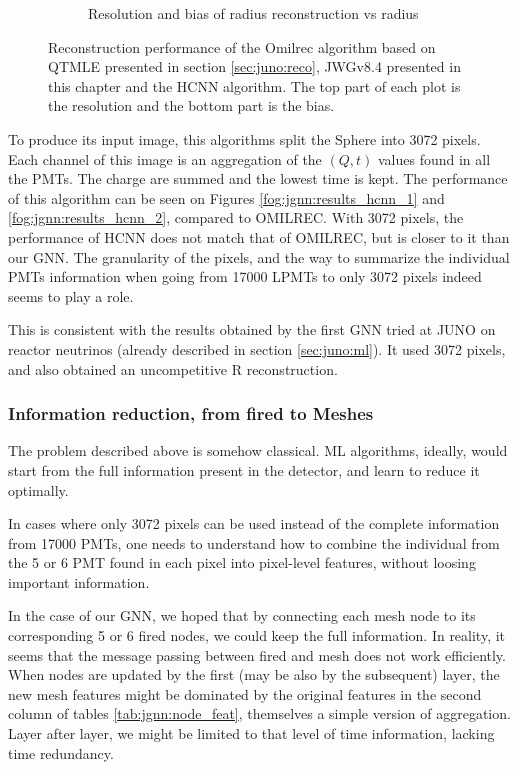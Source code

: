 \documentclass[../main.tex]{subfiles}
\begin{document}
\begin{figure}[ht]
\begin{subfigure}[t]{0.48\linewidth}
    \caption{Resolution and bias of radius reconstruction vs radius}
    \label{fig:jgnn:MSBvRTC_hcnn}
  \end{subfigure}
  \caption{Reconstruction performance of the Omilrec algorithm based on QTMLE presented in section \ref{sec:juno:reco}, JWGv8.4 presented in this chapter and the HCNN algorithm. The top part of each plot is the resolution and the bottom part is the bias.}
  \label{fig:jgnn:results_hcnn_2}
\end{figure}


To produce its input image, this algorithms split the Sphere into 3072 pixels. Each channel of this image is an aggregation of the $(Q, t)$ values found in all the PMTs. The charge are summed and the lowest time is kept. The performance of this algorithm can be seen on Figures \ref{fog:jgnn:results_hcnn_1} and \ref{fog:jgnn:results_hcnn_2}, compared to OMILREC. With 3072 pixels, the performance of HCNN does not match that of OMILREC, but is closer to it than our GNN. The granularity of the pixels, and the way to summarize the individual PMTs information when going from 17000 LPMTs to only 3072 pixels indeed seems to play a role.

This is consistent with the results obtained by the first GNN tried at JUNO on reactor neutrinos (already described in section \ref{sec:juno:ml}).
It used 3072 pixels, and also obtained an uncompetitive R reconstruction.

\subsubsection{Information reduction, from fired to Meshes}

The problem described above is somehow classical. ML algorithms, ideally, would start from the full information present in the detector, and learn to reduce it optimally.

In cases where only 3072 pixels can be used instead of the complete information from 17000 PMTs, one needs to understand how to combine the individual from the 5 or 6 PMT found in each pixel into pixel-level features, without loosing important information.

In the case of our GNN, we hoped that by connecting each mesh node to its corresponding 5 or 6 fired nodes, we could keep the full information. In reality, it seems that the message passing between fired and mesh does not work efficiently. When nodes are updated by the first (may be also by the subsequent) layer, the new mesh features might be dominated by the original features in the second column of tables \ref{tab:jgnn:node_feat}, themselves a simple version of aggregation.
Layer after layer, we might be limited to that level of time information, lacking time redundancy.
\end{document}
